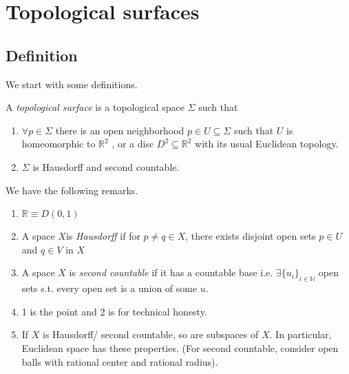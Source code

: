 \section{Topological surfaces}
\subsection{Definition}
We start with some definitions.
\begin{definition}
    A \textit{topological surface} is a topological space \(\Sigma\) such that
    \begin{enumerate}
        \item \(\forall p \in \Sigma\) there is an open neighborhood \(p \in U \subseteq \Sigma\) such that \(U\) is homeomorphic to \(\mathbb{R}^2\) , or a disc \(D^2 \subseteq \mathbb{R}^2\) with its usual Euclidean topology.
        \item \(\Sigma\) is Hausdorff and second countable.
    \end{enumerate}
\end{definition}
\begin{remark}
    We have the following remarks.
    \begin{enumerate}
        \item \(\mathbb{R}\equiv D(0,1)\) 
        \item A space \(X\)is \textit{Hausdorff} if for \(p \neq q \in X\), there exists disjoint open sets \(p \in U\) and \(q \in V\) in \(X\)
        \item A space \(X\) is \textit{second countable} if it has a countable base i.e. \(\exists \{u_i\}_{i \in \mathbb{N}}\) open sets s.t. every open set is a union of some \(u\).
        \item 1 is the point and 2 is for technical honesty.
        \item If \(X\) is Hausdorff/ second countable, so are subspaces of \(X\). In particular, Euclidean space has these properties. (For second countable, consider open balls with rational center and rational radius).
    \end{enumerate}
\end{remark}
